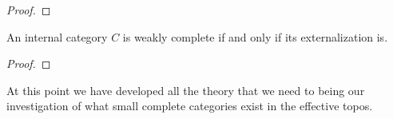 \begin{proof}


\end{proof}


\begin{thm}\label{thm:complete:completeexternalization}
  An internal category $C$ is weakly complete if and only if its
  externalization is.
\end{thm}
\begin{proof}

\end{proof}
At this point we have developed all the theory that we need to being
our investigation of what small complete categories exist in the
effective topos.


